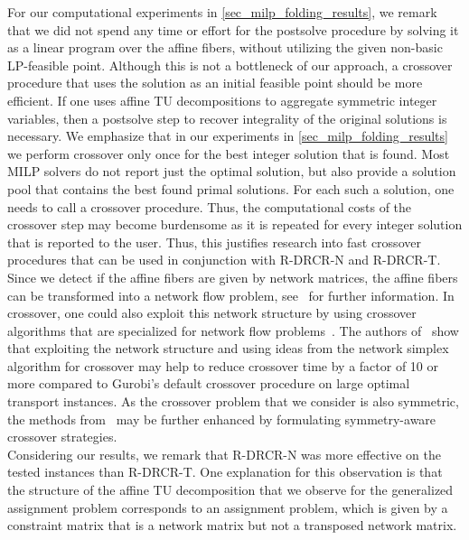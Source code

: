 \documentclass[pdflatex,sn-mathphys-num]{sn-jnl}%
\theoremstyle{thmstyleone}%
\theoremstyle{thmstylethree}%
\theoremstyle{thmstyletwo}%
\begin{document}
For our computational experiments in \cref{sec_milp_folding_results}, we remark that we did not spend any time or effort for the postsolve procedure by solving it as a linear program over the affine fibers, without utilizing the given non-basic LP-feasible point. Although this is not a bottleneck of our approach, a crossover procedure that uses the solution as an initial feasible point should be more efficient. 
If one uses affine TU decompositions to aggregate symmetric integer variables, then a postsolve step to recover integrality of the original solutions is necessary. We emphasize that in our experiments in \cref{sec_milp_folding_results} we perform crossover only once for the best integer solution that is found. Most MILP solvers do not report just the optimal solution, but also provide a solution pool that contains the best found primal solutions. For each such a solution, one needs to call a crossover procedure. Thus, the computational costs of the crossover step may become burdensome as it is repeated for every integer solution that is reported to the user. Thus, this justifies research into fast crossover procedures that can be used in conjunction with R-DRCR-N and R-DRCR-T.\\

Since we detect if the affine fibers are given by  network matrices, the affine fibers can be transformed into a network flow problem, see~\cite{Bixby1980} for further information.
In crossover, one could also exploit this network structure by using crossover algorithms that are specialized for network flow problems~\cite{Ge2025}. The authors of~\cite{Ge2025} show that exploiting the network structure and using ideas from the network simplex algorithm for crossover may help to reduce crossover time by a factor of 10 or more compared to Gurobi's default crossover procedure on large optimal transport instances. As the crossover problem that we consider is also symmetric, the methods from~\cite{Ge2025} may be further enhanced by formulating symmetry-aware crossover strategies.\\

Considering our results, we remark that R-DRCR-N was more effective on the tested instances than R-DRCR-T. One explanation for this observation is that the structure of the affine TU decomposition that we observe for the generalized assignment problem corresponds to an assignment problem, which is given by a constraint matrix that is a network matrix but not a transposed network matrix. \\
\end{document}
